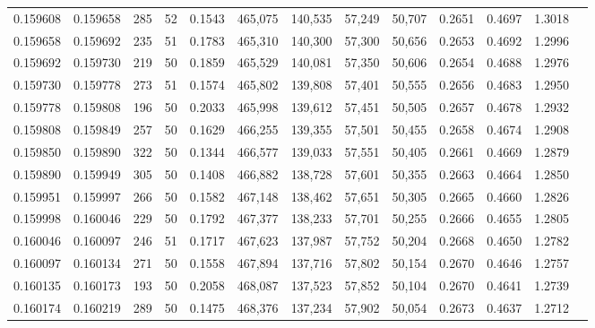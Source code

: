 \begin{tabular}{rrrrrrrrrrrrr}
0.159608 & 0.159658 &   285 &  52 &                                     0.1543 & 465,075 & 140,535 &  57,249 &  50,707 & 0.2651 & 0.4697 & 1.3018 \\
0.159658 & 0.159692 &   235 &  51 &                                     0.1783 & 465,310 & 140,300 &  57,300 &  50,656 & 0.2653 & 0.4692 & 1.2996 \\
0.159692 & 0.159730 &   219 &  50 &                                     0.1859 & 465,529 & 140,081 &  57,350 &  50,606 & 0.2654 & 0.4688 & 1.2976 \\
0.159730 & 0.159778 &   273 &  51 &                                     0.1574 & 465,802 & 139,808 &  57,401 &  50,555 & 0.2656 & 0.4683 & 1.2950 \\
0.159778 & 0.159808 &   196 &  50 &                                     0.2033 & 465,998 & 139,612 &  57,451 &  50,505 & 0.2657 & 0.4678 & 1.2932 \\
0.159808 & 0.159849 &   257 &  50 &                                     0.1629 & 466,255 & 139,355 &  57,501 &  50,455 & 0.2658 & 0.4674 & 1.2908 \\
0.159850 & 0.159890 &   322 &  50 &                                     0.1344 & 466,577 & 139,033 &  57,551 &  50,405 & 0.2661 & 0.4669 & 1.2879 \\
0.159890 & 0.159949 &   305 &  50 &                                     0.1408 & 466,882 & 138,728 &  57,601 &  50,355 & 0.2663 & 0.4664 & 1.2850 \\
0.159951 & 0.159997 &   266 &  50 &                                     0.1582 & 467,148 & 138,462 &  57,651 &  50,305 & 0.2665 & 0.4660 & 1.2826 \\
0.159998 & 0.160046 &   229 &  50 &                                     0.1792 & 467,377 & 138,233 &  57,701 &  50,255 & 0.2666 & 0.4655 & 1.2805 \\
0.160046 & 0.160097 &   246 &  51 &                                     0.1717 & 467,623 & 137,987 &  57,752 &  50,204 & 0.2668 & 0.4650 & 1.2782 \\
0.160097 & 0.160134 &   271 &  50 &                                     0.1558 & 467,894 & 137,716 &  57,802 &  50,154 & 0.2670 & 0.4646 & 1.2757 \\
0.160135 & 0.160173 &   193 &  50 &                                     0.2058 & 468,087 & 137,523 &  57,852 &  50,104 & 0.2670 & 0.4641 & 1.2739 \\
0.160174 & 0.160219 &   289 &  50 &                                     0.1475 & 468,376 & 137,234 &  57,902 &  50,054 & 0.2673 & 0.4637 & 1.2712 \\

\end{tabular}
